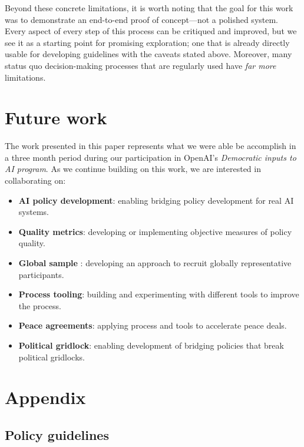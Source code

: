 \documentclass{article}
\begin{document}
Beyond these concrete limitations, it is worth noting that the goal for this work was to demonstrate an end-to-end proof of concept---not a polished system. Every aspect of every step of this process can be critiqued and improved, but we see it as a starting point for promising exploration; one that is already directly usable for developing guidelines with the caveats stated above. Moreover, many status quo decision-making processes that are regularly used have \emph{far more} limitations.

\section{Future work}

The work presented in this paper represents what we were able be accomplish in a three month period during our participation in OpenAI's \emph{Democratic inputs to AI program}.  As we continue building on this work, we are interested in collaborating on:
\begin{itemize}
    \item \textbf{AI policy development}: enabling bridging policy development for real AI systems.  
    \item \textbf{Quality metrics}: developing or implementing objective measures of policy quality.
    \item \textbf{Global sample} : developing an approach to recruit globally representative participants.
    \item \textbf{Process tooling}: building and experimenting with different tools to improve the process.
    \item \textbf{Peace agreements}: applying process and tools to accelerate peace deals.
    \item \textbf{Political gridlock}: enabling development of bridging policies that break political gridlocks.
\end{itemize}






\appendix\section{Appendix}

\subsection{Policy guidelines}\label{A:policies}
\end{document}
